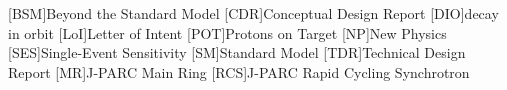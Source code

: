 \begin{acronym}
[BSM]{Beyond the Standard Model}
[CDR]{Conceptual Design Report}
[DIO]{decay in orbit}
[LoI]{Letter of Intent}
[POT]{Protons on Target}
[NP]{New Physics}
[SES]{Single-Event Sensitivity}
[SM]{Standard Model}
[TDR]{Technical Design Report}
[MR]{J-PARC Main Ring}
[RCS]{J-PARC Rapid Cycling Synchrotron}
\end{acronym}

